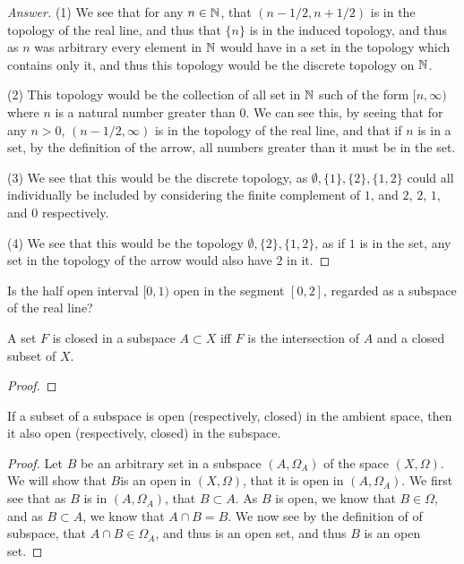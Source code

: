 \begin{proof}[Answer]
  (1) We see that for any $n\in \mathbb{N}$, that $(n-1/2, n+1/2)$ is in the
  topology of the real line, and thus that $\{n\}$ is in the induced
  topology, and thus as $n$ was arbitrary every element in $\mathbb{N}$ would
  have in a set in the topology which contains only it, and thus this
  topology would be the discrete topology on $\mathbb{N}$.

  (2) This topology would be the collection of all set in $\mathbb{N}$ such
  of the form $[n, \infty)$ where $n$ is a natural number greater than
  $0$. We can see this, by seeing that for any $n>0$, $(n-1/2,\infty)$
  is in the topology of the real line, and that if $n$ is in a set, by
  the definition of the arrow, all numbers greater than it must be in
  the set.
  
  (3) We see that this would be the discrete topology, as
  $\emptyset,\{1\},\{2\}, \{1,2\}$ could all individually be included
    by considering the finite complement of $1$, and $2$, $2$, $1$,
    and $0$ respectively.

  (4) We see that this would be the topology $\emptyset,\{2\},
  \{1,2\}$, as if $1$ is in the set, any set in the topology of the
  arrow would also have $2$ in it.
\end{proof}

\begin{minorEx}%
Is the half open interval $[0, 1)$ open in the segment $[0, 2]$, regarded as a subspace of the real line?
\end{minorEx}

\begin{majorEx}%
A set $F$ is closed in a subspace $A \subset X$ iff $F$ is the intersection of $A$ and a closed subset of $X$.
\end{majorEx}
\begin{proof}
\end{proof}

\begin{minorEx}%
If a subset of a subspace is open (respectively, closed) in the ambient space, then it also open (respectively, closed) in the subspace.
\end{minorEx}

\begin{proof}
  Let $B$ be an arbitrary set in a subspace $(A,\Omega_A)$ of the
  space $(X,\Omega)$. We will show that $B$is an open in $(X,\Omega)$,
  that it is open in $(A,\Omega_A)$. We first see that as $B$ is in
  $(A,\Omega_A)$, that $B \subset A$. As $B$ is open, we know that
  $B\in \Omega$, and as $B \subset A$, we know that $A\cap B=B$. We
  now see by the definition of of subspace, that $A\cap B \in
  \Omega_A$, and thus is an open set, and thus $B$ is an open set.
\end{proof}



